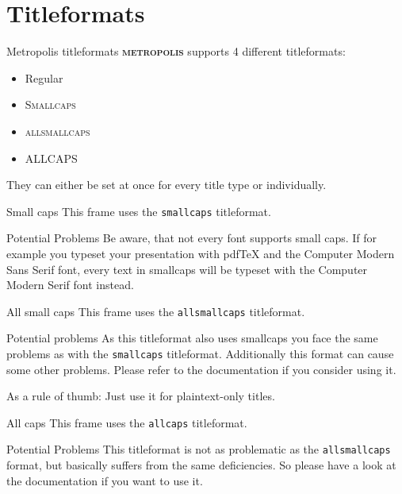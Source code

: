 \documentclass[10pt]{beamer}
\newcommand{\themename}{\textbf{\textsc{metropolis}}\xspace}
\begin{document}
\section{Titleformats}

\begin{frame}{Metropolis titleformats}
	\themename supports 4 different titleformats:
	\begin{itemize}
		\item Regular
		\item \textsc{Smallcaps}
		\item \textsc{allsmallcaps}
		\item ALLCAPS
	\end{itemize}
	They can either be set at once for every title type or individually.
	
\end{frame}

{
\begin{frame}{Small caps}
	This frame uses the \texttt{smallcaps} titleformat.

	\begin{alertblock}{Potential Problems}
		Be aware, that not every font supports small caps. If for example you typeset your presentation with pdfTeX and the Computer Modern Sans Serif font, every text in smallcaps will be typeset with the Computer Modern Serif font instead.
	\end{alertblock}
\end{frame}
}

{
\begin{frame}{All small caps}
	This frame uses the \texttt{allsmallcaps} titleformat.

	\begin{alertblock}{Potential problems}
		As this titleformat also uses smallcaps you face the same problems as with the \texttt{smallcaps} titleformat. Additionally this format can cause some other problems. Please refer to the documentation if you consider using it.

		As a rule of thumb: Just use it for plaintext-only titles.
	\end{alertblock}
\end{frame}
}

{
\begin{frame}{All caps}
	This frame uses the \texttt{allcaps} titleformat.

	\begin{alertblock}{Potential Problems}
		This titleformat is not as problematic as the \texttt{allsmallcaps} format, but basically suffers from the same deficiencies. So please have a look at the documentation if you want to use it.
	\end{alertblock}
\end{frame}
}
\end{document}
